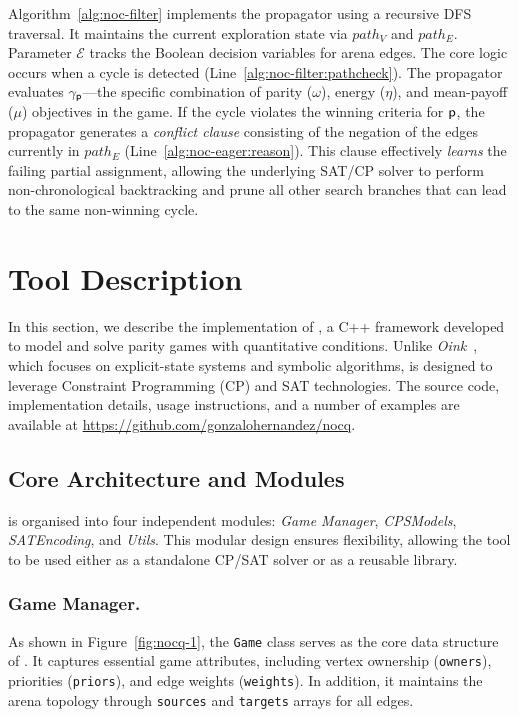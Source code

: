 \documentclass[runningheads]{llncs}
\begin{document}
Algorithm~\ref{alg:noc-filter} implements the \noc propagator using a recursive DFS traversal. It maintains the current exploration state via $path_V$ and $path_E$. Parameter $\mathcal{E}$ tracks the Boolean decision variables for arena edges. The core logic occurs when a cycle is detected (Line~\ref{alg:noc-filter:pathcheck}). The propagator evaluates $\gamma_{\mathsf{p}}$---the specific combination of parity ($\omega$), energy ($\eta$), and mean-payoff ($\mu$) objectives in the game. 
%
If the cycle violates the winning criteria for $\mathsf{p}$, the propagator generates a \textit{conflict clause} consisting of the negation of the edges currently in $path_E$ (Line~\ref{alg:noc-eager:reason}). This clause effectively {\em learns} the failing partial assignment, allowing the underlying SAT/CP solver to perform non-chronological backtracking and prune all other search branches that can lead to the same non-winning cycle.

\section{Tool Description}

In this section, we describe the implementation of \nocq, a C++ framework developed to model and solve parity games with quantitative conditions. Unlike \emph{Oink}~\cite{vanDijk:2018}, which focuses on explicit-state systems and symbolic algorithms, \nocq is designed to leverage Constraint Programming (CP) and SAT technologies. The source code, implementation details, usage instructions, and a number of examples are available at \url{https://github.com/gonzalohernandez/nocq}.

\subsection*{Core Architecture and Modules}

\nocq is organised into four independent modules: \emph{Game Manager}, \emph{CPSModels}, \emph{SATEncoding}, and \emph{Utils}. This modular design ensures flexibility, allowing the tool to be used either as a standalone CP/SAT solver or as a reusable library.


\subsubsection*{Game Manager.}

As shown in Figure~\ref{fig:nocq-1}, the \texttt{Game} class serves as the core data structure of \nocq. It captures essential game attributes, including vertex ownership (\texttt{owners}), priorities (\texttt{priors}), and edge weights (\texttt{weights}). In addition, it maintains the arena topology through \texttt{sources} and \texttt{targets} arrays for all edges.
\end{document}
